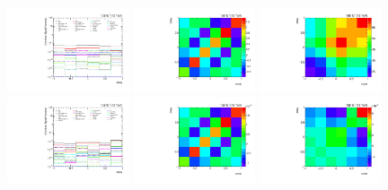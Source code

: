 \begin{figure}[htb]
\begin{center}
 \includegraphics[width=0.32\textwidth]{fig_fullRun2UL/unfolding/combined/deltaSystCombinedlog_rebinnedB_ll_cHel.pdf}
 \includegraphics[width=0.32\textwidth]{fig_fullRun2UL/unfolding/combined/StatCovMatrix_rebinnedB_ll_cHel.pdf}
 \includegraphics[width=0.32\textwidth]{fig_fullRun2UL/unfolding/combined/TotalSystCovMatrix_rebinnedB_ll_cHel.pdf} \\
 \includegraphics[width=0.32\textwidth]{fig_fullRun2UL/unfolding/combined/deltaSystCombinedlogNorm_rebinnedB_ll_cHel.pdf}
 \includegraphics[width=0.32\textwidth]{fig_fullRun2UL/unfolding/combined/StatCovMatrixNorm_rebinnedB_ll_cHel.pdf}
 \includegraphics[width=0.32\textwidth]{fig_fullRun2UL/unfolding/combined/TotalSystCovMatrixNorm_rebinnedB_ll_cHel.pdf} \\

\end{center}
\end{figure}
